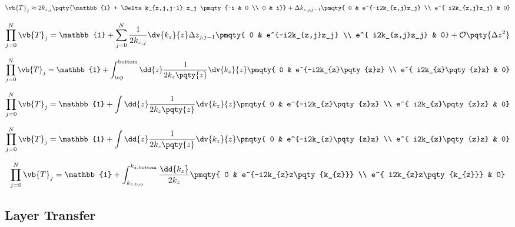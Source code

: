 \begin{align*}
	\vb{T}_j &\approx2k_{z,j} \pqty{\mathbb{1} 
			+ \Delta k_{z,j,j-1} z_j \pmqty{-i & 0 \\ 0 & i}}
		+ \Delta k_{z,j,j-1}\pmqty{
		0 &
		e^{-i2k_{z,j}z_j}  \\
		e^{ i2k_{z,j}z_j} &
		0} \\
\end{align*}

\begin{align*}
	\prod_{j=0}^N \vb{T}_j = \mathbb{1} + \sum_{j=0}^N\frac{1}{2k_{z,j}}\dv{k_{z}}{z} \Delta z_{j,j-1}\pmqty{
		0 &
		e^{-i2k_{z,j}z_j}  \\
		e^{ i2k_{z,j}z_j} &
		0} + \mathcal{O}\pqty{\Delta z^2}
\end{align*}

\begin{align*}
	\prod_{j=0}^N \vb{T}_j = \mathbb{1} + \int_\text{top}^\text{bottom} \dd{z} \frac{1}{2k_{z}\pqty{z}}\dv{k_{z}}{z} \pmqty{
		0 &
		e^{-i2k_{z}\pqty{z}z}  \\
		e^{ i2k_{z}\pqty{z}z} &
		0}
\end{align*}

\begin{align*}
	\prod_{j=0}^N \vb{T}_j = \mathbb{1} + \int \dd{z} \frac{1}{2k_{z}\pqty{z}}\dv{k_{z}}{z} \pmqty{
		0 &
		e^{-i2k_{z}\pqty{z}z}  \\
		e^{ i2k_{z}\pqty{z}z} &
		0}
\end{align*}

\begin{align*}
	\prod_{j=0}^N \vb{T}_j = \mathbb{1} + \int \dd{z} \frac{1}{2k_{z}\pqty{z}}\dv{k_{z}}{z} \pmqty{
		0 &
		e^{-i2k_{z}\pqty{z}z}  \\
		e^{ i2k_{z}\pqty{z}z} &
		0}
\end{align*}

\begin{align*}
	\prod_{j=0}^N \vb{T}_j = \mathbb{1} + \int_{k_{z,\text{top}}}^{k_{z,\text{bottom}}}  \frac{\dd{k_z}}{2k_{z}} \pmqty{
		0 &
		e^{-i2k_{z}z\pqty{k_{z}}}  \\
		e^{ i2k_{z}z\pqty{k_{z}}} &
		0}
\end{align*}




\subsection{Layer Transfer} %
\label{sub:layer_transfer}

